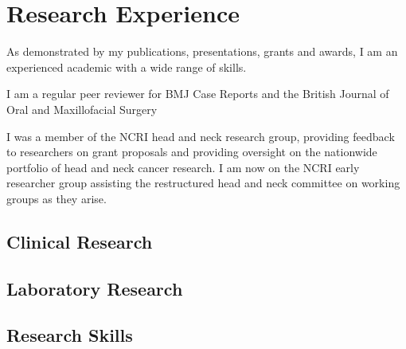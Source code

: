 \section*{Research Experience}

As demonstrated by my publications, presentations, grants and awards, I am an experienced academic with a wide range of skills.

I am a regular peer reviewer for BMJ Case Reports and the British Journal of Oral and Maxillofacial Surgery

I was a member of the NCRI head and neck research group, providing feedback to researchers on grant proposals and providing oversight on the nationwide portfolio of head and neck cancer research. I am now on the NCRI early researcher group assisting the restructured head and neck committee on working groups as they arise.

\subsection*{Clinical Research}

\subsection*{Laboratory Research}

\subsection*{Research Skills}

